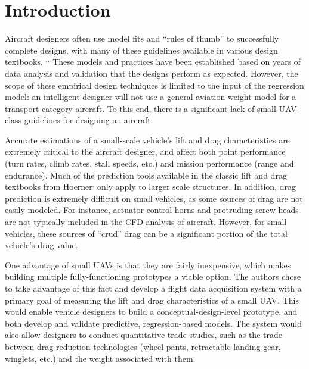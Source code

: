 \chapter{Introduction}
\label{intro}
Aircraft designers often use model fits and ``rules of thumb'' to successfully complete designs, with many of these guidelines available in various design textbooks. \cite{raymer}$^,$\cite{nicolai2010fundamentals}$^,$\cite{roskam1985airplane} These models and practices have been established based on years of data analysis and validation that the designs perform as expected. However, the scope of these empirical design techniques is limited to the input of the regression model: an intelligent designer will not use a general aviation weight model for a transport category aircraft. To this end, there is a significant lack of small UAV-class guidelines for designing an aircraft.

 Accurate estimations of a small-scale vehicle's lift and drag characteristics are extremely critical to the aircraft designer, and affect both point performance (turn rates, climb rates, stall speeds, etc.) and mission performance (range and endurance). Much of the prediction tools available in the classic lift and drag textbooks from Hoerner\cite{hoernerDrag}$^,$\cite{hoernerLift} only apply to larger scale structures. In addition, drag prediction is extremely difficult on small vehicles, as some sources of drag are not easily modeled. For instance, actuator control horns and protruding screw heads are not typically included in the CFD  analysis of aircraft. However, for small vehicles, these sources of ``crud'' drag can be a significant portion of the total vehicle's drag value. 
 
 One advantage of small UAVs is that they are fairly inexpensive, which makes building multiple fully-functioning prototypes a viable option. The authors chose to take advantage of this fact and develop a flight data acquisition system with a primary goal of measuring the lift and drag characteristics of a small UAV. This would enable vehicle designers to build a conceptual-design-level prototype, and both develop and validate predictive, regression-based models. The system would also allow designers to conduct quantitative trade studies, such as the trade between drag reduction technologies (wheel pants, retractable landing gear, winglets, etc.) and the weight associated with them.\\

